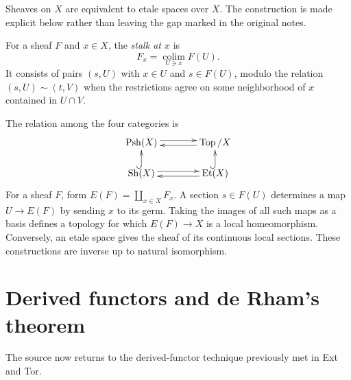 \begin{remark}
\label{at-remark-sheaves-etale-equivalence}
Sheaves on $X$ are equivalent to etale spaces
over $X$.  The construction is made explicit
below rather than leaving the gap marked in
the original notes.
\end{remark}

\begin{definition}
\label{at-definition-sheaf-stalk}
For a sheaf $F$ and $x\in X$, the
\emph{stalk at $x$} is
$$
F_x=\underset{U\ni x}{\operatorname{colim}}
F(U).
$$
It consists of pairs $(s,U)$ with $x\in U$
and $s\in F(U)$, modulo the relation
$(s,U)\sim(t,V)$ when the restrictions agree
on some neighborhood of $x$ contained in
$U\cap V$.
\end{definition}

The relation among the four categories is
$$
\xymatrix@C=38pt@R=16pt{
\operatorname{Psh}(X)
\ar@<.6ex>[r]&
\operatorname{Top}/X
\ar@<.6ex>[l]\\
\operatorname{Sh}(X)
\ar@<.6ex>[r]\ar@{^{(}->}[u]&
\operatorname{Et}(X)
\ar@<.6ex>[l]\ar@{^{(}->}[u].
}
$$
For a sheaf $F$, form
$E(F)=\coprod_{x\in X}F_x$.  A section
$s\in F(U)$ determines a map
$U\longrightarrow E(F)$ by sending $x$ to
its germ.  Taking the images of all such maps
as a basis defines a topology for which
$E(F)\longrightarrow X$ is a local
homeomorphism.  Conversely, an etale space
gives the sheaf of its continuous local
sections.  These constructions are inverse
up to natural isomorphism.
\section{Derived functors and de Rham's
theorem}
\label{section-derived-functors-de-rham}

The source now returns to the derived-functor
technique previously met in Ext and Tor.

